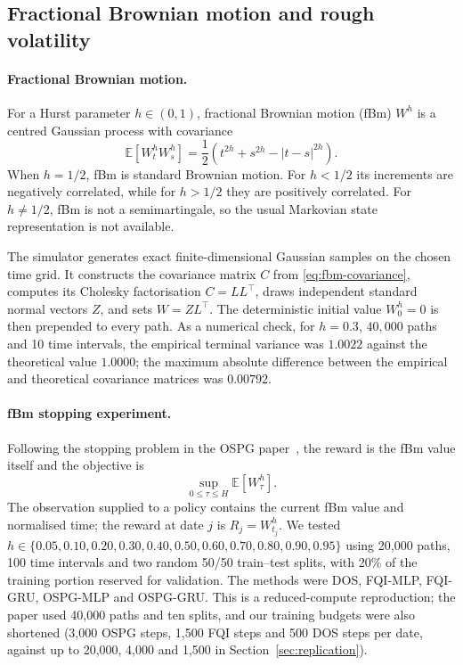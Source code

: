 \subsection{Fractional Brownian motion and rough volatility}
\label{sec:roughvol}

\paragraph{Fractional Brownian motion.}
For a Hurst parameter $h\in(0,1)$, fractional Brownian motion (fBm)
$W^h$ is a centred Gaussian process with covariance
\begin{equation}
  \mathbb E[W_t^h W_s^h]
  =\frac12\left(t^{2h}+s^{2h}-|t-s|^{2h}\right).
  \label{eq:fbm-covariance}
\end{equation}
When $h=1/2$, fBm is standard Brownian motion. For $h<1/2$ its increments
are negatively correlated, while for $h>1/2$ they are positively correlated.
For $h\ne1/2$, fBm is not a semimartingale, so the usual Markovian
state representation is not available.

The simulator generates exact finite-dimensional Gaussian samples on the
chosen time grid. It constructs the covariance matrix $C$ from
\eqref{eq:fbm-covariance}, computes its Cholesky factorisation
$C=LL^\top$, draws independent standard normal vectors $Z$, and sets
$W=ZL^\top$. The deterministic initial value $W_0^h=0$ is then prepended
to every path. As a numerical check, for $h=0.3$, $40{,}000$ paths and
10 time intervals, the empirical terminal variance was $1.0022$ against
the theoretical value $1.0000$; the maximum absolute difference between
the empirical and theoretical covariance matrices was $0.00792$.

\paragraph{fBm stopping experiment.}
Following the stopping problem in the OSPG paper~\cite{ospg2023}, the reward is the fBm
value itself and the objective is
\begin{equation}
  \sup_{0\leq\tau\leq H}\mathbb E[W_\tau^h].
\end{equation}
The observation supplied to a policy contains the current fBm value and
normalised time; the reward at date $j$ is $R_j=W_{t_j}^h$. We tested
$h\in\{0.05,0.10,0.20,0.30,0.40,0.50,0.60,0.70,0.80,0.90,0.95\}$
using 20,000 paths, 100 time intervals and two random 50/50 train--test
splits, with 20\% of the training portion reserved for validation. The
methods were DOS, FQI-MLP, FQI-GRU, OSPG-MLP and OSPG-GRU. This is a
reduced-compute reproduction; the paper used 40,000 paths and ten splits, and our
training budgets were also shortened (3{,}000 OSPG steps, 1{,}500 FQI steps and 500
DOS steps per date, against up to 20{,}000, 4{,}000 and 1{,}500 in
Section~\ref{sec:replication}).

